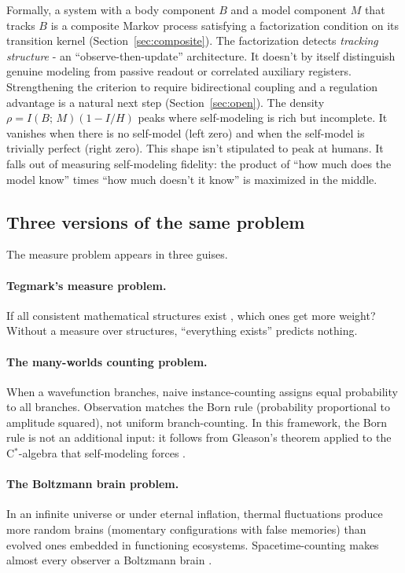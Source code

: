 \documentclass[12pt]{article}
\theoremstyle{remark}
\begin{document}
Formally, a system with a body component $B$ and a model component $M$ that tracks $B$ is a composite Markov process satisfying a factorization condition on its transition kernel (Section~\ref{sec:composite}). The factorization detects \emph{tracking structure} - an ``observe-then-update'' architecture. It doesn't by itself distinguish genuine modeling from passive readout or correlated auxiliary registers. Strengthening the criterion to require bidirectional coupling and a regulation advantage is a natural next step (Section~\ref{sec:open}). The density $\rho = I(B;\,M)(1 - I/H)$ peaks where self-modeling is rich but incomplete. It vanishes when there is no self-model (left zero) and when the self-model is trivially perfect (right zero). This shape isn't stipulated to peak at humans. It falls out of measuring self-modeling fidelity: the product of ``how much does the model know'' times ``how much doesn't it know'' is maximized in the middle.

\subsection{Three versions of the same problem}

The measure problem appears in three guises.

\paragraph{Tegmark's measure problem.}
If all consistent mathematical structures exist \cite{tegmark1998,tegmark2008}, which ones get more weight? Without a measure over structures, ``everything exists'' predicts nothing.

\paragraph{The many-worlds counting problem.}
When a wavefunction branches, naive instance-counting assigns equal probability to all branches. Observation matches the Born rule (probability proportional to amplitude squared), not uniform branch-counting. In this framework, the Born rule is not an additional input: it follows from Gleason's theorem \cite{gleason1957} applied to the C$^*$-algebra that self-modeling forces \cite{ehrlich2026qm}.

\paragraph{The Boltzmann brain problem.}
In an infinite universe or under eternal inflation, thermal fluctuations produce more random brains (momentary configurations with false memories) than evolved ones embedded in functioning ecosystems. Spacetime-counting makes almost every observer a Boltzmann brain \cite{carroll2017}.
\end{document}
